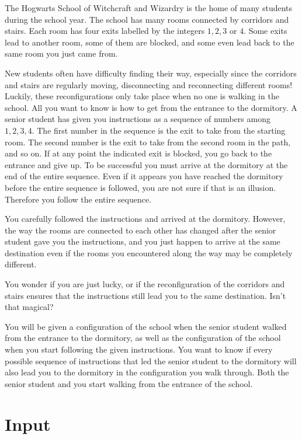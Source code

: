 
The Hogwarts School of Witchcraft and Wizardry is the home of many
students during the school year.  The school has many rooms connected
by corridors and stairs.  Each room has four exits labelled by the
integers $1, 2, 3$ or $4$.  Some exits lead to another room, some of them
are blocked, and some even lead back to the same room you just came
from.

New students often have difficulty finding their way, especially since
the corridors and stairs are regularly moving, disconnecting and
reconnecting different rooms!  Luckily, these reconfigurations only
take place when no one is walking in the school.  All you want to know
is how to get from the entrance to the dormitory.  A senior student
has given you instructions as a sequence of numbers among $1, 2, 3, 4$.
The first number in the sequence is the exit to take from the starting
room.  The second number is the exit to take from the second room in
the path, and so on.  If at any point the indicated exit is blocked,
you go back to the entrance and give up.  To be successful you must
arrive at the dormitory at the end of the entire sequence.  Even if it
appears you have reached the dormitory before the entire sequence is
followed, you are not sure if that is an illusion.  Therefore you 
follow the entire sequence.

You carefully followed the instructions and arrived at the dormitory.
However, the way the rooms are connected to each other has changed
after the senior student gave you the instructions, and you just
happen to arrive at the same destination even if the rooms you
encountered along the way may be completely different.

You wonder if you are just lucky, or if the reconfiguration of the
corridors and stairs ensures that the instructions still lead you
to the same destination. Isn't that magical?

You will be given a configuration of the school when the senior
student walked from the entrance to the dormitory, as well as the
configuration of the school when you start following the given
instructions.  You want to know if every possible sequence of
instructions that led the senior student to the
dormitory will also lead you to the dormitory in the configuration
you walk through.  Both the senior student and you start walking from
the entrance of the school.

\section*{Input}

